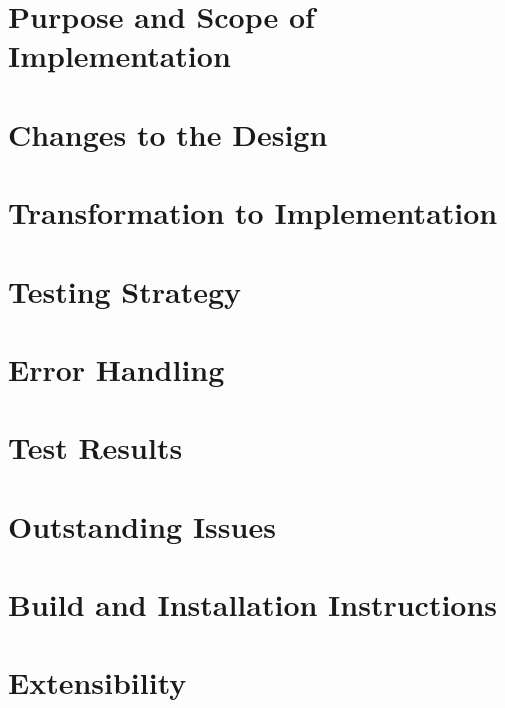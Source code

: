 \documentclass{report}
\begin{document}

\tableofcontents

\chapter{Purpose and Scope of Implementation}

\chapter{Changes to the Design}

\chapter{Transformation to Implementation}

\chapter{Testing Strategy}

\chapter{Error Handling}

\chapter{Test Results}

\chapter{Outstanding Issues}

\chapter{Build and Installation Instructions}

\chapter{Extensibility}
\end{document}
